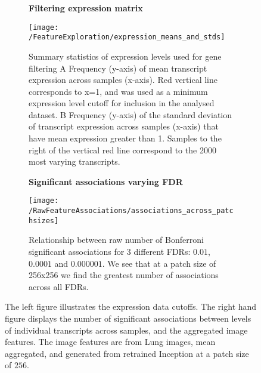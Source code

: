 \documentclass[graybox]{svmult}
\newcommand*{\figuretitle}[1]{%
    {\centering%
    \textbf{#1}%
    \par\medskip}%
}
\begin{document}
\begin{figure}[H]

\begin{subfigure}{0.45\textwidth}
\figuretitle{Filtering expression matrix}
\texttt{[image: /FeatureExploration/expression\_means\_and\_stds]}
\caption{Summary statistics of expression levels used for gene filtering \textcolor{ao(english)}{A} Frequency (y-axis) of mean transcript expression across samples (x-axis). Red vertical line corresponds to x=1, and was used as a minimum expression level cutoff for inclusion in the analysed dataset. \textcolor{ao(english)}{B} Frequency (y-axis) of the standard deviation of transcript expression across samples (x-axis) that have mean expression greater than 1. Samples to the right of the vertical red line correspond to the 2000 most varying transcripts.}
\label{fig:expression_means_and_stds}
\end{subfigure}
\hfill
\begin{subfigure}{0.45\textwidth}
\figuretitle{Significant associations varying FDR}
\texttt{[image: /RawFeatureAssociations/associations\_across\_patchsizes]}
\caption{Relationship between raw number of Bonferroni significant associations for 3 different FDRs: $0.01$, $0.0001$ and $0.000001$. We see that at a patch size of 256x256 we find the greatest number of associations across all FDRs.}
\label{fig:associations_raw_vs_retrained}
\end{subfigure}

\caption{The left figure illustrates the expression data cutoffs. The right hand figure displays the number of significant associations between levels of individual transcripts across samples, and the aggregated image features. The image features are from Lung images, mean aggregated, and generated from retrained Inception at a patch size of $256$.}
\label{fig:expression_cutoff_and_raw_significant_associations}
\end{figure}
\end{document}
